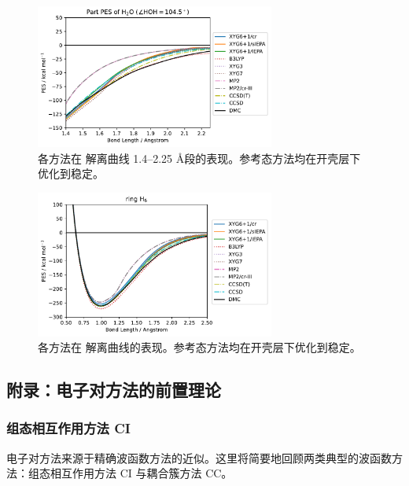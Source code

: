 \begin{figure}[h]
  \centering
  \caption{各方法在  解离曲线 1.4--2.25 \AA 段的表现。参考态方法均在开壳层下优化到稳定。}
  \label{fig.curve-H2O-part-stab}
  \includegraphics[width=0.7\textwidth]{assets/curve-H2O-part-stab.pdf}
\end{figure}

\begin{figure}[h]
  \centering
  \caption{各方法在  解离曲线的表现。参考态方法均在开壳层下优化到稳定。}
  \label{fig.curve-H6-stab}
  \includegraphics[width=0.7\textwidth]{assets/curve-H6-stab.pdf}
\end{figure}

\newpage

\subsection{附录：电子对方法的前置理论}

\subsubsection{组态相互作用方法 CI}

电子对方法来源于精确波函数方法的近似。这里将简要地回顾两类典型的波函数方法：组态相互作用方法 CI 与耦合簇方法 CC。

